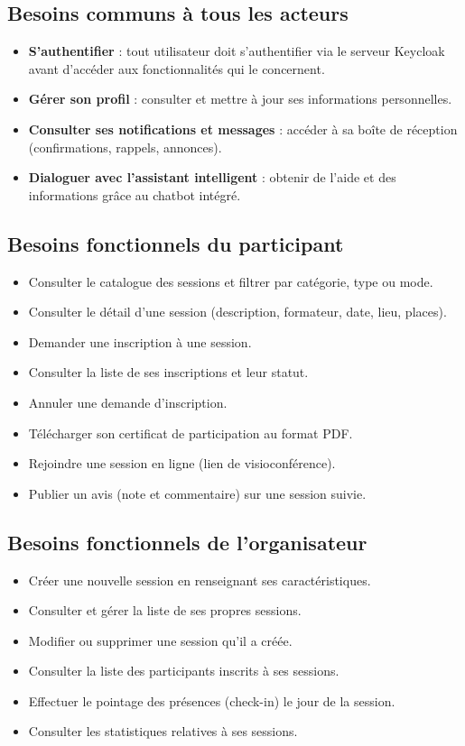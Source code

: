 \documentclass[12pt,a4paper,oneside]{report}
\begin{document}
\subsection{Besoins communs à tous les acteurs}
\begin{itemize}[leftmargin=1.2cm]
  \item \textbf{S'authentifier} : tout utilisateur doit s'authentifier via le serveur Keycloak
  avant d'accéder aux fonctionnalités qui le concernent.
  \item \textbf{Gérer son profil} : consulter et mettre à jour ses informations personnelles.
  \item \textbf{Consulter ses notifications et messages} : accéder à sa boîte de réception
  (confirmations, rappels, annonces).
  \item \textbf{Dialoguer avec l'assistant intelligent} : obtenir de l'aide et des
  informations grâce au chatbot intégré.
\end{itemize}

\subsection{Besoins fonctionnels du participant}
\begin{itemize}[leftmargin=1.2cm]
  \item Consulter le catalogue des sessions et filtrer par catégorie, type ou mode.
  \item Consulter le détail d'une session (description, formateur, date, lieu, places).
  \item Demander une inscription à une session.
  \item Consulter la liste de ses inscriptions et leur statut.
  \item Annuler une demande d'inscription.
  \item Télécharger son certificat de participation au format PDF.
  \item Rejoindre une session en ligne (lien de visioconférence).
  \item Publier un avis (note et commentaire) sur une session suivie.
\end{itemize}

\subsection{Besoins fonctionnels de l'organisateur}
\begin{itemize}[leftmargin=1.2cm]
  \item Créer une nouvelle session en renseignant ses caractéristiques.
  \item Consulter et gérer la liste de ses propres sessions.
  \item Modifier ou supprimer une session qu'il a créée.
  \item Consulter la liste des participants inscrits à ses sessions.
  \item Effectuer le pointage des présences (check-in) le jour de la session.
  \item Consulter les statistiques relatives à ses sessions.
\end{itemize}
\end{document}
